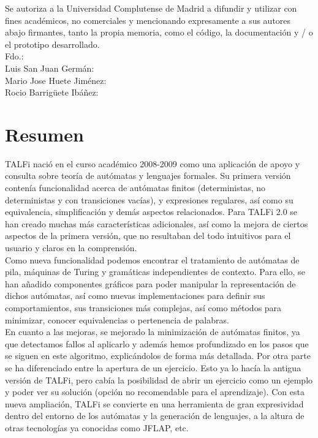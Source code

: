 \documentclass[12pt,a4paper,spanish]{book}
\begin{document}
Se autoriza a la Universidad Complutense de Madrid a difundir y utilizar con fines acad\'emicos, no comerciales y mencionando expresamente a sus autores abajo firmantes, tanto la propia memoria, como el c\'odigo, la documentaci\'on y / o el prototipo desarrollado.\\
\newline
\newline
Fdo.:\\
\newline
Luis San Juan Germ\'an:\\
\newline
\newline
\newline
\newline
Mario Jose Huete Jim\'enez:\\
\newline
\newline
\newline
\newline
Rocio Barrig\"{u}ete Ib\'a\~nez:\\
\tableofcontents


\chapter{Resumen}
TALFi naci\'o en el curso acad\'emico 2008-2009 como una aplicaci\'on de apoyo y consulta sobre teor\'ia de aut\'omatas y lenguajes formales.
Su primera versi\'on conten\'ia funcionalidad acerca de aut\'omatas finitos (deterministas, no deterministas y con transiciones vac\'ias), y expresiones regulares, as\'i como su equivalencia, simplificaci\'on y dem\'as aspectos relacionados.
Para TALFi 2.0 se han creado muchas m\'as caracter\'isticas adicionales, as\'i como la mejora de ciertos aspectos de la primera versi\'on, que no resultaban del todo intuitivos para el usuario y claros en la comprensi\'on.\\
Como nueva funcionalidad podemos encontrar el tratamiento de aut\'omatas de pila, m\'aquinas de Turing y gram\'aticas independientes de contexto. Para ello, se han a\~nadido componentes gr\'aficos para poder manipular la representaci\'on de dichos aut\'omatas, as\'i como nuevas implementaciones para definir sus comportamientos, sus transiciones m\'as complejas, as\'i como m\'etodos para minimizar, conocer equivalencias o pertenencia de palabras.\\
En cuanto a las mejoras, se mejorado la minimizaci\'on de aut\'omatas finitos, ya que detectamos fallos al aplicarlo y adem\'as hemos profundizado en los pasos que se siguen en este algoritmo, explic\'andolos de forma m\'as detallada. Por otra parte se ha diferenciado entre la apertura de un ejercicio. Esto ya lo hac\'ia la antigua versi\'on de TALFi, pero cab\'ia la posibilidad de abrir un ejercicio como un ejemplo y poder ver su soluci\'on (opci\'on no recomendable para el aprendizaje).
Con esta nueva ampliaci\'on, TALFi se convierte en una herramienta de gran expresividad dentro del entorno de los aut\'omatas y la generaci\'on de lenguajes, a la altura de otras tecnolog\'ias ya conocidas como JFLAP, etc. 
\end{document}
